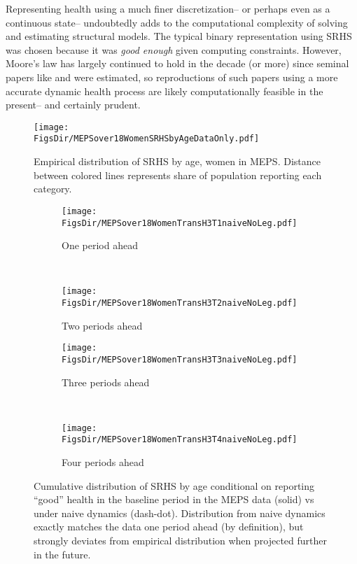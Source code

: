 \documentclass[12pt,pdftex,letterpaper]{article}
\newcommand{\RootDir}{..}
\newcommand{\FigsDir}{\RootDir/Figures}
\newcommand{\TablesDir}{\RootDir/Tables}
\begin{document}
Representing health using a much finer discretization-- or perhaps even as a continuous state-- undoubtedly adds to the computational complexity of solving and estimating structural models.  The typical binary representation using SRHS was chosen because it was \textit{good enough} given computing constraints.  However, Moore's law has largely continued to hold in the decade (or more) since seminal papers like \cite{BlauGilleskie08} and \cite{DeNardi10} were estimated, so reproductions of such papers using a more accurate dynamic health process are likely computationally feasible in the present-- and certainly prudent.

\newpage



\newpage






\begin{figure}[H]
	\centering
	\texttt{[image: \\FigsDir/MEPSover18WomenSRHSbyAgeDataOnly.pdf]}
	\caption{Empirical distribution of SRHS by age, women in MEPS. Distance between colored lines represents share of population reporting each category.}\label{fig:SRHSdstnMEPSwomen}
\end{figure}


\begin{figure}[H]
	\centering
	\begin{subfigure}[b]{0.45\textwidth}
		\texttt{[image: \\FigsDir/MEPSover18WomenTransH3T1naiveNoLeg.pdf]}
		\caption{One period ahead}\label{fig:Naive1Ahead}
	\end{subfigure}
	~
	\begin{subfigure}[b]{0.45\textwidth}
		\texttt{[image: \\FigsDir/MEPSover18WomenTransH3T2naiveNoLeg.pdf]}
		\caption{Two periods ahead}\label{fig:Naive2Ahead}
	\end{subfigure}
	
	\begin{subfigure}[b]{0.45\textwidth}
		\texttt{[image: \\FigsDir/MEPSover18WomenTransH3T3naiveNoLeg.pdf]}
		\caption{Three periods ahead}\label{fig:Naive3Ahead}
	\end{subfigure}
	~
	\begin{subfigure}[b]{0.45\textwidth}
		\texttt{[image: \\FigsDir/MEPSover18WomenTransH3T4naiveNoLeg.pdf]}
		\caption{Four periods ahead}\label{fig:Naive4AheadGood}
	\end{subfigure}
	\caption{Cumulative distribution of SRHS by age conditional on reporting ``good'' health in the baseline period in the MEPS data (solid) vs under naive dynamics (dash-dot).  Distribution from naive dynamics exactly matches the data one period ahead (by definition), but strongly deviates from empirical distribution when projected further in the future.}\label{fig:NaiveTransGood}
\end{figure}
\end{document}
